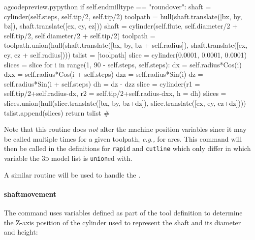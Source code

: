 \documentclass{ltxdoc}
\begin{document}
\lstset{firstnumber=\thegcpy}
\begin{writecode}{a}{gcodepreview.py}{python}
        if self.endmilltype == "roundover":
            shaft = cylinder(self.steps, self.tip/2, self.tip/2)
            toolpath = hull(shaft.translate([bx, by, bz]), shaft.translate([ex, ey, ez]))
            shaft = cylinder(self.flute, self.diameter/2 + self.tip/2, self.diameter/2 + self.tip/2)
            toolpath = toolpath.union(hull(shaft.translate([bx, by, bz + self.radius]), shaft.translate([ex, ey, ez + self.radius])))
            tslist = [toolpath]
            slice = cylinder(0.0001, 0.0001, 0.0001)
            slices = slice
            for i in range(1, 90 - self.steps, self.steps):
                dx = self.radius*Cos(i)
                dxx = self.radius*Cos(i + self.steps)
                dzz = self.radius*Sin(i)
                dz = self.radius*Sin(i + self.steps)
                dh = dz - dzz
                slice = cylinder(r1 = self.tip/2+self.radius-dx, r2 = self.tip/2+self.radius-dxx, h = dh)
                slices = slices.union(hull(slice.translate([bx, by, bz+dz]), slice.translate([ex, ey, ez+dz])))
                tslist.append(slices)
            return tslist
#
\end{writecode}
\addtocounter{gcpy}{71}

%
%
%

\noindent Note that this routine does \emph{not} alter the machine position variables since it may be called multiple times for a given toolpath, \emph{e.g.,} for arcs. This command will then be called in the definitions for \verb|rapid| and \verb|cutline| which only differ in which variable the \textsc{3d} model list is \verb|union|ed with.

A similar routine will be used to handle the .

\paragraph{shaftmovement} The  command uses variables defined as part of the tool definition to determine the Z-axis position of the cylinder used to represent the shaft and its diameter and height:
\end{document}
